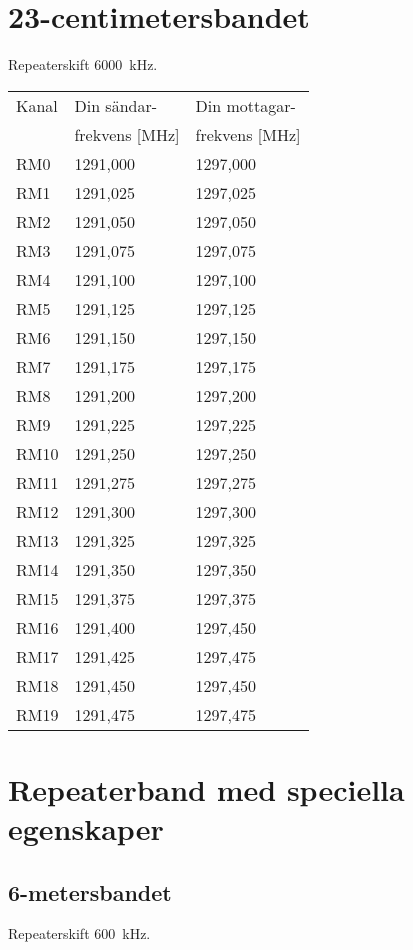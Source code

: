 \section{23-centimetersbandet}
Repeaterskift 6000~kHz.

\begin{tabular}{ l | l | l }
  Kanal & Din sändar- & Din mottagar- \\
        & frekvens [MHz] & frekvens [MHz] \\
  \hline
  RM0 & 1291,000 & 1297,000 \\
  RM1 & 1291,025 & 1297,025 \\
  RM2 & 1291,050 & 1297,050 \\
  RM3 & 1291,075 & 1297,075 \\
  RM4 & 1291,100 & 1297,100 \\
  RM5 & 1291,125 & 1297,125 \\
  RM6 & 1291,150 & 1297,150 \\
  RM7 & 1291,175 & 1297,175 \\
  RM8 & 1291,200 & 1297,200 \\
  RM9 & 1291,225 & 1297,225 \\
  RM10 & 1291,250 & 1297,250 \\
  RM11 & 1291,275 & 1297,275 \\
  RM12 & 1291,300 & 1297,300 \\
  RM13 & 1291,325 & 1297,325 \\
  RM14 & 1291,350 & 1297,350 \\
  RM15 & 1291,375 & 1297,375 \\
  RM16 & 1291,400 & 1297,450 \\
  RM17 & 1291,425 & 1297,475 \\
  RM18 & 1291,450 & 1297,450 \\
  RM19 & 1291,475 & 1297,475 \\
\end{tabular}

\section{Repeaterband med speciella egenskaper}
\subsection{6-metersbandet}
Repeaterskift 600~kHz.


